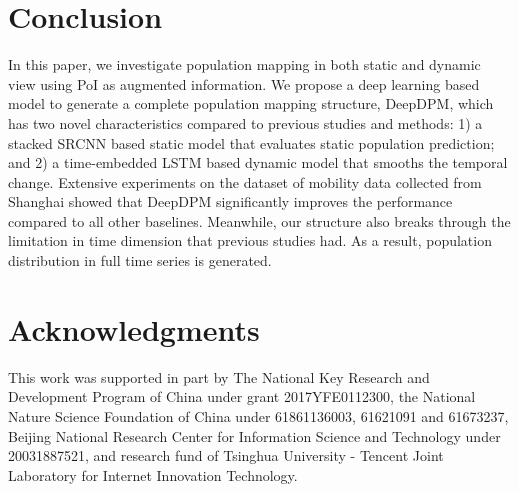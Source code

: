 \documentclass[letterpaper]{article} %
\begin{document}
\section{Conclusion}
\label{sec:Conclusion}
In this paper, we investigate population mapping in both static and dynamic view using PoI as augmented information. We propose a deep learning based model to generate a complete population mapping structure, DeepDPM, which has two novel characteristics compared to previous studies and methods: 1) a stacked SRCNN based static model that evaluates static population prediction; and 2) a time-embedded LSTM based dynamic model that smooths the temporal change. Extensive experiments on the dataset of mobility data collected from Shanghai showed that DeepDPM significantly improves the performance compared to all other baselines. Meanwhile, our structure also breaks through the limitation in time dimension that previous studies had. As a result, population distribution in full time series is generated.

\section{Acknowledgments} \label{acknowledg}
This work was supported in part by The National Key Research and Development Program of China under grant 2017YFE0112300, the National Nature Science Foundation of China under 61861136003, 61621091 and 61673237, Beijing National Research Center for Information Science and Technology under 20031887521, and research fund of Tsinghua University - Tencent Joint Laboratory for Internet Innovation Technology.



\end{document}

